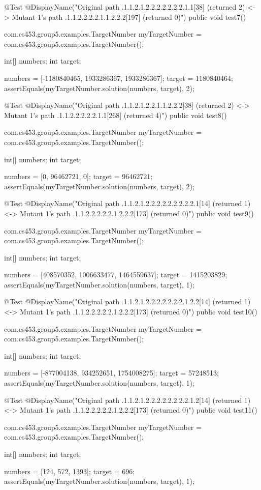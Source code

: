 @Test
@DisplayName("Original path .1.1.2.1.2.2.2.2.2.2.2.1.1[38] (returned 2) <-> Mutant 1's path .1.1.2.2.2.2.1.1.2.2.2[197] (returned 0)")
public void test7() {
    com.cs453.group5.examples.TargetNumber myTargetNumber = com.cs453.group5.examples.TargetNumber();

    int[] numbers;
    int target;

    numbers = [-1180840465, 1933286367, 1933286367];
    target = 1180840464;
    assertEquals(myTargetNumber.solution(numbers, target), 2);
}

@Test
@DisplayName("Original path .1.1.2.1.2.2.1.1.2.2.2[38] (returned 2) <-> Mutant 1's path .1.1.2.2.2.2.2.1.1[268] (returned 4)")
public void test8() {
    com.cs453.group5.examples.TargetNumber myTargetNumber = com.cs453.group5.examples.TargetNumber();

    int[] numbers;
    int target;

    numbers = [0, 96462721, 0];
    target = 96462721;
    assertEquals(myTargetNumber.solution(numbers, target), 2);
}

@Test
@DisplayName("Original path .1.1.2.1.2.2.2.2.2.2.2.2.2.1[14] (returned 1) <-> Mutant 1's path .1.1.2.2.2.2.2.1.2.2.2[173] (returned 0)")
public void test9() {
    com.cs453.group5.examples.TargetNumber myTargetNumber = com.cs453.group5.examples.TargetNumber();

    int[] numbers;
    int target;

    numbers = [408570352, 1006633477, 1464559637];
    target = 1415203829;
    assertEquals(myTargetNumber.solution(numbers, target), 1);
}

@Test
@DisplayName("Original path .1.1.2.1.2.2.2.2.2.2.2.1.2.2[14] (returned 1) <-> Mutant 1's path .1.1.2.2.2.2.2.1.2.2.2[173] (returned 0)")
public void test10() {
    com.cs453.group5.examples.TargetNumber myTargetNumber = com.cs453.group5.examples.TargetNumber();

    int[] numbers;
    int target;

    numbers = [-877004138, 934252651, 1754008275];
    target = 57248513;
    assertEquals(myTargetNumber.solution(numbers, target), 1);
}

@Test
@DisplayName("Original path .1.1.2.1.2.2.2.2.2.2.2.2.1.2[14] (returned 1) <-> Mutant 1's path .1.1.2.2.2.2.2.1.2.2.2[173] (returned 0)")
public void test11() {
    com.cs453.group5.examples.TargetNumber myTargetNumber = com.cs453.group5.examples.TargetNumber();

    int[] numbers;
    int target;

    numbers = [124, 572, 1393];
    target = 696;
    assertEquals(myTargetNumber.solution(numbers, target), 1);
}


